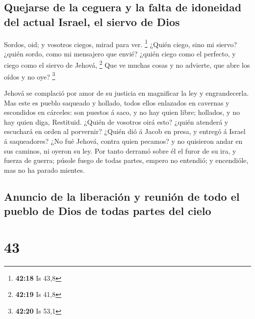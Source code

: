\hypertarget{quejarse-de-la-ceguera-y-la-falta-de-idoneidad-del-actual-israel-el-siervo-de-dios}{%
\subsection{Quejarse de la ceguera y la falta de idoneidad del actual
Israel, el siervo de
Dios}\label{quejarse-de-la-ceguera-y-la-falta-de-idoneidad-del-actual-israel-el-siervo-de-dios}}

 Sordos, oid; y vosotros ciegos, mirad para ver.
\footnote{\textbf{42:18} Is 43,8}  ¿Quién ciego, sino mi
siervo? ¿quién sordo, como mi mensajero que envié? ¿quién ciego como el
perfecto, y ciego como el siervo de Jehová, \footnote{\textbf{42:19} Is
  41,8}  Que ve muchas cosas y no advierte, que abre los
oídos y no oye? \footnote{\textbf{42:20} Is 53,1}

 Jehová se complació por amor de su justicia en magnificar
la ley y engrandecerla.  Mas este es pueblo saqueado y
hollado, todos ellos enlazados en cavernas y escondidos en cárceles: son
puestos á saco, y no hay quien libre; hollados, y no hay quien diga,
Restituid.  ¿Quién de vosotros oirá esto? ¿quién atenderá y
escuchará en orden al porvernir?  ¿Quién dió á Jacob en
presa, y entregó á Israel á saqueadores? ¿No fué Jehová, contra quien
pecamos? y no quisieron andar en sus caminos, ni oyeron su ley.
 Por tanto derramó sobre él el furor de su ira, y fuerza de
guerra; púsole fuego de todas partes, empero no entendió; y encendióle,
mas no ha parado mientes.

\hypertarget{anuncio-de-la-liberaciuxf3n-y-reuniuxf3n-de-todo-el-pueblo-de-dios-de-todas-partes-del-cielo}{%
\subsection{Anuncio de la liberación y reunión de todo el pueblo de Dios
de todas partes del
cielo}\label{anuncio-de-la-liberaciuxf3n-y-reuniuxf3n-de-todo-el-pueblo-de-dios-de-todas-partes-del-cielo}}

\hypertarget{section-42}{%
\section{43}\label{section-42}}


